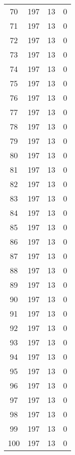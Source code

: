 \begin{longtable}[!]{c|ccc}
	70	& 197	& 13	& 0	\\
	71	& 197	& 13	& 0	\\
	72	& 197	& 13	& 0	\\
	73	& 197	& 13	& 0	\\
	74	& 197	& 13	& 0	\\
	75	& 197	& 13	& 0	\\
	76	& 197	& 13	& 0	\\
	77	& 197	& 13	& 0	\\
	78	& 197	& 13	& 0	\\
	79	& 197	& 13	& 0	\\
	80	& 197	& 13	& 0	\\
	81	& 197	& 13	& 0	\\
	82	& 197	& 13	& 0	\\
	83	& 197	& 13	& 0	\\
	84	& 197	& 13	& 0	\\
	85	& 197	& 13	& 0	\\
	86	& 197	& 13	& 0	\\
	87	& 197	& 13	& 0	\\
	88	& 197	& 13	& 0	\\
	89	& 197	& 13	& 0	\\
	90	& 197	& 13	& 0	\\
	91	& 197	& 13	& 0	\\
	92	& 197	& 13	& 0	\\
	93	& 197	& 13	& 0	\\
	94	& 197	& 13	& 0	\\
	95	& 197	& 13	& 0	\\
	96	& 197	& 13	& 0	\\
	97	& 197	& 13	& 0	\\
	98	& 197	& 13	& 0	\\
	99	& 197	& 13	& 0	\\
	100	& 197	& 13	& 0	\\
\end{longtable}


